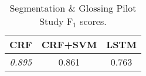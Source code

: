 
\begin{table}[t]
\begin{center}
\begin{tabular}{ccc}
\bf CRF & \bf CRF+SVM & \bf LSTM \\
\hline
\emph{0.895} & 0.861 & 0.763  \\
\end{tabular}
\caption[Segmentation and Glossing Pilot Study Results]{Segmentation \& Glossing Pilot Study F$_1$ scores.
}
\label{tab:pilot1Results}
\end{center}
\end{table}

